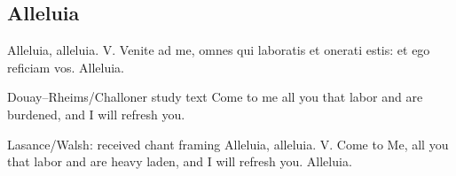 \subsection{Alleluia}
\label{proper-alleluia}
\begin{latinproper}
Alleluia, alleluia. V. Venite ad me, omnes qui laboratis et onerati estis: et ego reficiam vos. Alleluia.
\end{latinproper}
\begin{englishwitness}{Douay--Rheims/Challoner study text}
Come to me all you that labor and are burdened, and I will refresh you.
\end{englishwitness}
\begin{englishwitness}{Lasance/Walsh: received chant framing}
Alleluia, alleluia. V. Come to Me, all you that labor and are heavy laden, and I will refresh you. Alleluia.
\end{englishwitness}

